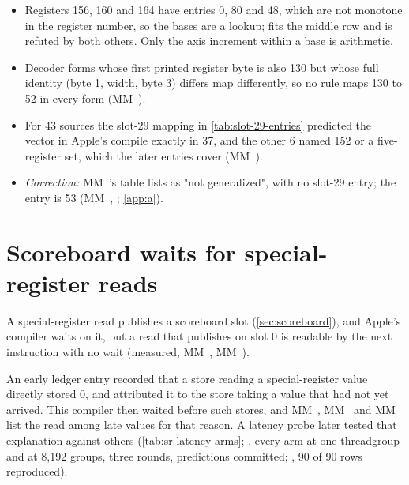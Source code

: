 \begin{itemize}
\item Registers 156, 160 and 164 have entries 0, 80 and 48, which are not monotone in the register number, so the bases are a lookup;  fits the middle row and is refuted by both others. Only the axis increment within a base is arithmetic.
\item Decoder forms whose first printed register byte is also 130 but whose full
  identity (byte 1, width, byte 3) differs map differently, so no rule maps 130 to 52 in every form (MM~).
\item For 43 sources the slot-29 mapping in \cref{tab:slot-29-entries} predicted the vector in Apple's compile exactly in
  37, and the other 6 named 152 or a five-register set, which the later entries cover (MM~).
\item \emph{Correction:} MM~'s table lists  as "not generalized", with no slot-29 entry; the entry is 53 (MM~,
  ; \cref{app:a}).
\end{itemize}

\section{Scoreboard waits for special-register reads}\label{sec:read-latency-whether}

A special-register read publishes a scoreboard slot (\cref{sec:scoreboard}), and Apple's compiler waits on it,
but a read that publishes on slot 0 is readable by the next instruction with no wait (measured, MM~, MM~).

An early ledger entry recorded that a store reading a special-register value
directly stored 0, and attributed it to the store taking a value that had not yet arrived. This compiler then waited before such stores, and
MM~, MM~ and MM~ list the read among late values for that reason. A latency probe later tested that explanation against others (\cref{tab:sr-latency-arms}; , every arm at one threadgroup and at 8,192 groups, three rounds, predictions committed;
, 90 of 90 rows reproduced).

